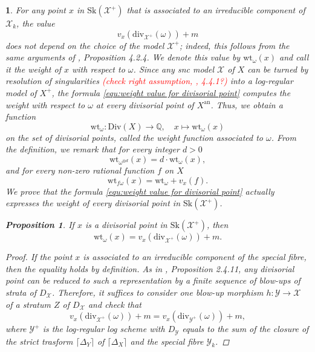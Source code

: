 \documentclass{amsart}%
\numberwithin{equation}{subsection}
\theoremstyle{plain2}
\newtheorem{prop}[equation]{Proposition}
\theoremstyle{definition2}
\theoremstyle{stepstyle}
\theoremstyle{point}
\theoremstyle{subpoint}
\newtheorem{subpoint}[equation]{}%
\newcommand{\spa}[1]{\begin{subpoint}#1\end{subpoint}}           %
\newcommand{\Q}{\ensuremath{\mathbb{Q}}}
\newcommand{\cX}{\ensuremath{\mathscr{X}}}
\newcommand{\cY}{\ensuremath{\mathscr{Y}}}
\renewcommand{\cY}{\ensuremath{\mathscr{Y}}}
\newcommand{\an}{\mathrm{an}}
\newcommand{\divisor}{\mathrm{div}}
\newcommand{\weight}{\mathrm{wt}}
\newcommand{\Sk}{\mathrm{Sk}}
\begin{document}
\spa{For any point $x$ in $\Sk(\cX^+)$ that is associated to an irreducible component of $\cX_k$, the value \begin{equation} \label{equ:weight value for divisorial point}
v_x(\divisor_{\cX^+}(\omega)) +m
\end{equation} does not depend on the choice of the model $\cX^+$; indeed, this follows from the same arguments of \cite{MustataNicaise}, Proposition 4.2.4. We denote this value by $\weight_{\omega}(x)$ and call it the weight of $x$ with respect to $\omega$. Since any snc model $\cX$ of $X$ can be turned by resolution of singularities \textcolor{red}{(check right assumption, \cite{MustataNicaise}, 4.4.1?)} into a log-regular model of $X^+$, the formula \ref{equ:weight value for divisorial point} computes the weight with respect to $\omega$ at every divisorial point of $X^\an$. Thus, we obtain a function $$\weight_{\omega}: \text{Div}(X) \rightarrow \Q, \quad x \mapsto \weight_{\omega}(x)$$ on the set of divisorial points, called the weight function associated to $\omega$. From the definition, we remark that for every integer $d>0$ $$ \weight_{\omega^{\otimes d} }(x)= d \cdot \weight_{\omega}(x),$$ and for every non-zero rational function $f$ on $X$ $$ \weight_{f\omega}(x)= \weight_{\omega} + v_x(f).$$ We prove that the formula \ref{equ:weight value for divisorial point} actually expresses the weight of every divisorial point in $\Sk(\cX^+)$.

\begin{prop} \label{prop weight function on log regular model}
If $x$ is a divisorial point in $\Sk(\cX^+)$, then $$\weight_{\omega}(x)=v_x(\divisor_{\cX^+}(\omega)) +m.$$
\end{prop}
\begin{proof}
If the point $x$ is associated to an irreducible component of the special fibre, then the equality holds by definition. As in \cite{MustataNicaise}, Proposition 2.4.11, any divisorial point can be reduced to such a representation by a finite sequence of blow-ups of strata of $D_\cX$. Therefore, it suffices to consider one blow-up morphism $h:\cY \rightarrow \cX$ of a stratum $Z$ of $D_\cX$ and check that $$v_x(\divisor_{\cX^+}(\omega)) +m=v_x(\divisor_{\cY^+}(\omega)) +m,$$ where $\cY^+$ is the log-regular log scheme with $D_\cY$ equals to the sum of the closure of the strict trasform $\lceil \Delta_Y \rceil$ of $\lceil\Delta_X \rceil$ and the special fibre $\cY_k$.


\end{proof}}
\end{document}
